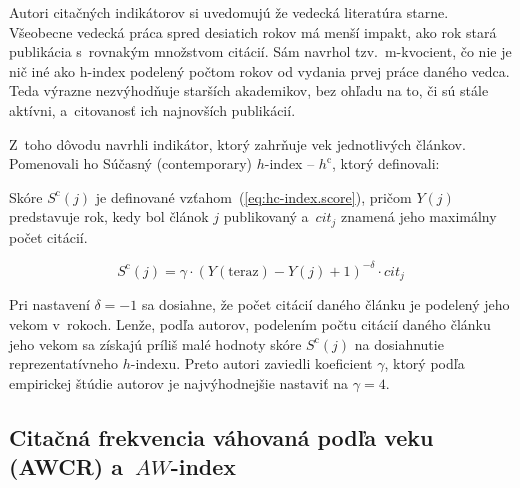 Autori citačných indikátorov si uvedomujú že vedecká literatúra starne.
Všeobecne vedecká práca spred desiatich rokov má menší impakt, ako rok stará
publikácia s~rovnakým množstvom citácií.  Sám \citet{Hirsch2005} navrhol
tzv.~m-kvocient, čo nie je nič iné ako h-index podelený počtom rokov od vydania
prvej práce daného vedca.  Teda výrazne nezvýhodňuje starších akademikov, bez
ohľadu na to, či sú stále aktívni, a~citovanosť ich najnovších publikácií.

Z~toho dôvodu \citet{Sidiropoulos2007} navrhli indikátor, ktorý zahrňuje vek
jednotlivých článkov.  Pomenovali ho Súčasný (contemporary)
$h$-index -- $h^{\mathrm{c}}$, ktorý definovali:


Skóre $S^{\mathrm{c}}(j)$ je definované vzťahom~(\ref{eq:hc-index.score}),
pričom $Y(j)$ predstavuje rok, kedy bol článok $j$ publikovaný
a~$\mathit{cit}_j$ znamená jeho maximálny počet citácií.

\begin{equation}
\label{eq:hc-index.score}
S^{\mathrm{c}}(j) = \gamma\cdot (Y(\mathrm{teraz}) - Y(j) + 1)^{-\delta}\cdot \mathit{cit}_j
\end{equation}

Pri nastavení $\delta = -1$ sa dosiahne, že počet citácií daného článku je
podelený jeho vekom v~rokoch.  Lenže, podľa autorov, podelením počtu citácií
daného článku jeho vekom sa získajú príliš malé hodnoty skóre
$S^{\mathrm{c}}(j)$ na dosiahnutie reprezentatívneho $h$-indexu.  Preto autori
zaviedli koeficient $\gamma$, ktorý podľa empirickej štúdie autorov je
najvýhodnejšie nastaviť na $\gamma = 4$.

\subsection{Citačná frekvencia váhovaná podľa veku (AWCR) a~$\mathit{AW}$-index}
\label{sec:aw-index}

